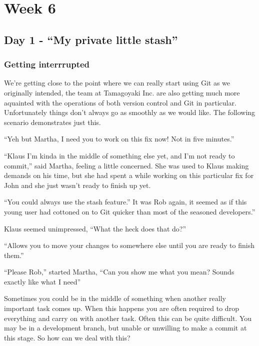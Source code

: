 \cleardoublepage
\chapter{Week 6}

\section{Day 1 - ``My private little stash''}
\subsection{Getting interrrupted}

We're getting close to the point where we can really start using Git as we originally intended, the team at Tamagoyaki Inc. are also getting much more aquainted with the operations of both version control and Git in particular.  Unfortunately things don't always go as smoothly as we would like.  The following scenario demonstrates just this.

\begin{trenches}
``Yeh but Martha, I need you to work on this fix now!  Not in five minutes.''

``Klaus I'm kinda in the middle of something else yet, and I'm not ready to commit,'' said Martha, feeling a little concerned.  She was used to Klaus making demands on his time, but she had spent a while working on this particular fix for John and she just wasn't ready to finish up yet.

``You could always use the stash feature.''  It was Rob again, it seemed as if this young user had cottoned on to Git quicker than most of the seasoned developers.''

Klaus seemed unimpressed, ``What the heck does that do?''

``Allows you to move your changes to somewhere else until you are ready to finish them.''

``Please Rob,'' started Martha, ``Can you show me what you mean?  Sounds exactly like what I need''
\end{trenches}

Sometimes you could be in the middle of something when another really important task comes up.  When this happens you are often required to drop everything and carry on with another task.  Often this can be quite difficult.  You may be in a development branch, but unable or unwilling to make a commit at this stage.  So how can we deal with this?

